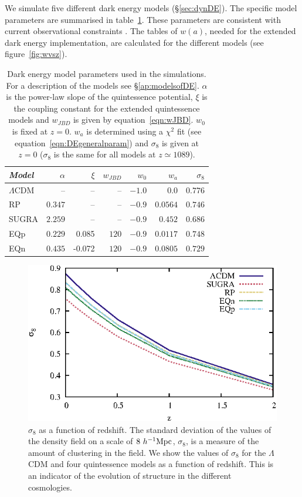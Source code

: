We simulate five different dark energy models (\S\ref{sec:dynDE}). The specific model parameters are summarised in table~\ref{tab:DEparams}. 
These parameters are consistent with current observational constraints \citep{acquaviva05, amanullah10, komatsu11}. The tables of $w(a)$, 
needed for the extended dark energy implementation, are calculated for the different models (see figure~\ref{fig:wvsz}).

\begin{table}
\begin{tabular*}{\textwidth}{@{\extracolsep{\fill}}lrrrrrr}
\itshape Model & \itshape $\alpha$& \itshape $\xi$& \itshape $w_{JBD}$& \itshape $w_0$& \itshape $w_a$& \itshape $\sigma_8$ \\ \hline
$\Lambda$CDM & -- & -- & -- & $-1.0$ & $0.0$ & $0.776$ \\
RP & $0.347$ & -- & -- & $-0.9$ & $0.0564$ & $0.746$ \\
SUGRA & $2.259$ & -- & -- & $-0.9$ & $0.452$ & $0.686$ \\
EQp & $0.229$ & 0.085 & $120$ & $-0.9$ & $0.0117$ & $0.748$ \\
EQn & $0.435$ & -0.072 & $120$ & $-0.9$ & $0.0805$ & $0.729$ \\  \hline
\end{tabular*}
\caption{Dark energy model parameters used in the simulations. For a description of the models see \S\ref{ap:modelsofDE}.
$\alpha$ is the power-law slope of the quintessence potential, $\xi$ is the coupling constant for the extended quintessence
models and $w_{JBD}$ is given by equation~\ref{eqn:wJBD}. $w_0$ is fixed at $z=0$.
$w_a$ is determined using a $\chi^2$ fit (see equation~\ref{eqn:DEgeneralparam}) and $\sigma_8$ is given at $z=0$ ($\sigma_8$
is the same for all models at $z\simeq1089$).}
\label{tab:DEparams}
\end{table}

\begin{figure}
\includegraphics[width=\textwidth]{ch_voidsde/img/sigma8vsz}
\caption{$\sigma_8$ as a function of redshift. The standard deviation of the values of the density field on a scale of $8~h^{-1} {\rm Mpc}$, $\sigma_8$, is a measure of the amount of clustering in the field. We show the values of $\sigma_8$ for the $\Lambda$CDM and four quintessence models as a function of redshift. This is an indicator of the evolution of structure in the different cosmologies.}
\label{fig:sigma8vsz}
\end{figure}

